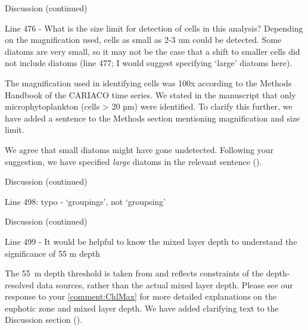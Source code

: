 \documentclass[12pt,english]{reviewresponse}
\begin{document}
\begin{revcomment}
	Discussion (continued)

    Line 476 - What is the size limit for detection of cells in this analysis? Depending on the magnification used, cells as small as 2-3 um could be detected. Some diatoms are very small, so it may not be the case that a shift to smaller cells did not include diatoms (line 477; I would suggest specifying ‘large’ diatoms here).
\end{revcomment}
\begin{revresponse}
	The magnification used in identifying cells was 100x according to the Methods Handbook of the CARIACO time series. We stated in the manuscript that only microphytoplankton (cells > 20 µm) were identified. To clarify this further, we have added a sentence to the Methods section mentioning magnification and size limit.
    
    We agree that small diatoms might have gone undetected. Following your suggestion, we have specified \textit{large} diatoms in the relevant sentence (). 
\end{revresponse}


\begin{revcomment}
	Discussion (continued)

    Line 498: typo - ‘groupings’, not ‘groupsing’
\end{revcomment}
\begin{revresponse}
\end{revresponse}



\begin{revcomment}
	Discussion (continued)

    Line 499 - It would be helpful to know the mixed layer depth to understand the significance of 55 m depth
\end{revcomment}

\begin{revresponse}
    The 55~m depth threshold is taken from \cite{pinckney_phytoplankton_2015} and reflects constraints of the depth-resolved data sources, rather than the actual mixed layer depth. 
    Please see our response to your \autoref{comment:ChlMax} for more detailed explanations on the euphotic zone and mixed layer depth.
    We have added clarifying text to the Discussion section ().
\end{revresponse}
\end{document}
